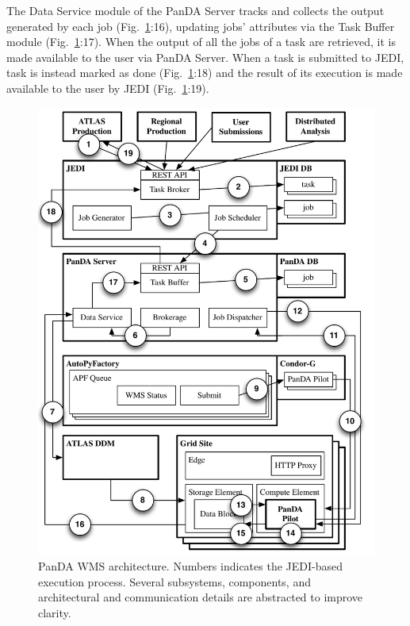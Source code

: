 The Data Service module of the PanDA Server tracks and collects the output
generated by each job (Fig.~\ref{fig:architecture}:16), updating jobs'
attributes via the Task Buffer module (Fig.~\ref{fig:architecture}:17). When the
output of all the jobs of a task are retrieved, it is made available to the user
via PanDA Server. When a task is submitted to JEDI, task is instead marked as
done (Fig.~\ref{fig:architecture}:18) and the result of its execution is made
available to the user by JEDI (Fig.~\ref{fig:architecture}:19).

\begin{figure}
    \centering
    \includegraphics[width=\columnwidth]{figures/panda_architecture.pdf}
    \vspace{-0.3in}
    \caption{PanDA WMS architecture. Numbers indicates the JEDI-based execution
    process. Several subsystems, components, and architectural and
    communication details are abstracted to improve clarity.}
\label{fig:architecture}
\end{figure}
